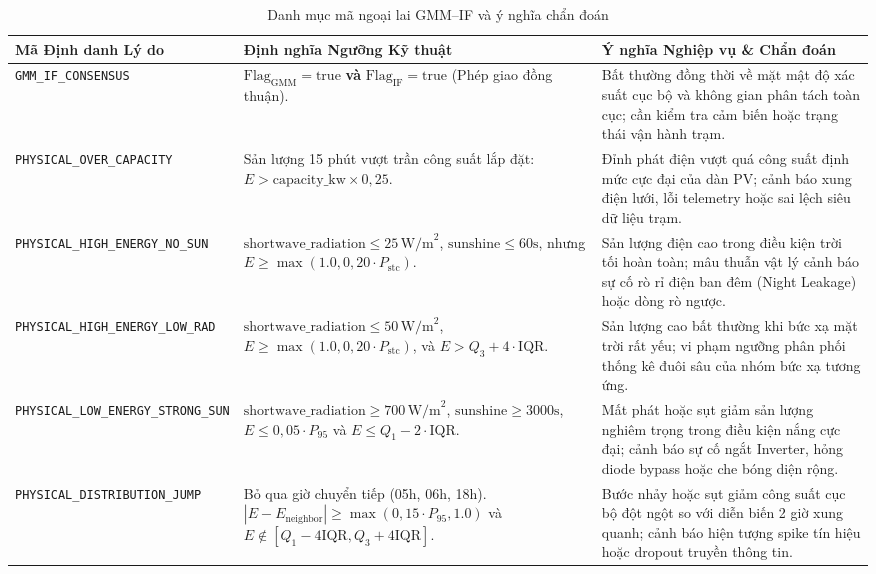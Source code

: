 \documentclass[12pt, a4paper]{report}
\begin{document}
\begin{table}[H]
\centering
\caption{Danh mục mã ngoại lai GMM--IF và ý nghĩa chẩn đoán}
\label{tab:outlier_reasons_dict}
\small
\renewcommand{\arraystretch}{1.3}
\begin{tabularx}{\textwidth}{@{} l p{4.5cm} X @{}}
\toprule
\textbf{Mã Định danh Lý do} & \textbf{Định nghĩa Ngưỡng Kỹ thuật} & \textbf{Ý nghĩa Nghiệp vụ \& Chẩn đoán} \\
\midrule
\texttt{GMM\_IF\_CONSENSUS} & 
$\text{Flag}_{\text{GMM}} = \text{true}$ \textbf{và} $\text{Flag}_{\text{IF}} = \text{true}$ (Phép giao đồng thuận). & 
Bất thường đồng thời về mặt mật độ xác suất cục bộ và không gian phân tách toàn cục; cần kiểm tra cảm biến hoặc trạng thái vận hành trạm. \\
\midrule
\texttt{PHYSICAL\_OVER\_CAPACITY} & 
Sản lượng 15 phút vượt trần công suất lắp đặt: $E > \text{capacity\_kw} \times 0{,}25$. & 
Đỉnh phát điện vượt quá công suất định mức cực đại của dàn PV; cảnh báo xung điện lưới, lỗi telemetry hoặc sai lệch siêu dữ liệu trạm. \\
\midrule
\texttt{PHYSICAL\_HIGH\_ENERGY\_NO\_SUN} & 
$\text{shortwave\_radiation} \le 25 \, \text{W/m}^2$, $\text{sunshine} \le 60\text{s}$, nhưng $E \ge \max(1.0, 0{,}20 \cdot P_{\text{stc}})$. & 
Sản lượng điện cao trong điều kiện trời tối hoàn toàn; mâu thuẫn vật lý cảnh báo sự cố rò rỉ điện ban đêm (Night Leakage) hoặc dòng rò ngược. \\
\midrule
\texttt{PHYSICAL\_HIGH\_ENERGY\_LOW\_RAD} & 
$\text{shortwave\_radiation} \le 50 \, \text{W/m}^2$, $E \ge \max(1.0, 0{,}20 \cdot P_{\text{stc}})$, và $E > Q_3 + 4 \cdot \text{IQR}$. & 
Sản lượng cao bất thường khi bức xạ mặt trời rất yếu; vi phạm ngưỡng phân phối thống kê đuôi sâu của nhóm bức xạ tương ứng. \\
\midrule
\texttt{PHYSICAL\_LOW\_ENERGY\_STRONG\_SUN} & 
$\text{shortwave\_radiation} \ge 700 \, \text{W/m}^2$, $\text{sunshine} \ge 3000\text{s}$, $E \le 0{,}05 \cdot P_{95}$ và $E \le Q_1 - 2 \cdot \text{IQR}$. & 
Mất phát hoặc sụt giảm sản lượng nghiêm trọng trong điều kiện nắng cực đại; cảnh báo sự cố ngắt Inverter, hỏng diode bypass hoặc che bóng diện rộng. \\
\midrule
\texttt{PHYSICAL\_DISTRIBUTION\_JUMP} & 
Bỏ qua giờ chuyển tiếp (05h, 06h, 18h). $|E - E_{\text{neighbor}}| \ge \max(0{,}15 \cdot P_{95}, 1.0)$ và $E \notin [Q_1 - 4\text{IQR}, Q_3 + 4\text{IQR}]$. & 
Bước nhảy hoặc sụt giảm công suất cục bộ đột ngột so với diễn biến 2 giờ xung quanh; cảnh báo hiện tượng spike tín hiệu hoặc dropout truyền thông tin. \\
\bottomrule
\end{tabularx}


\end{table}
\end{document}
